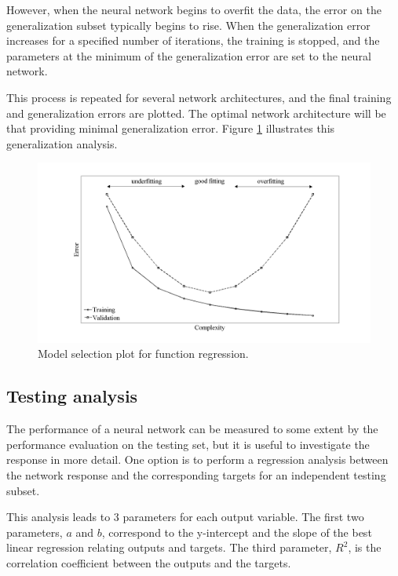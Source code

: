 However, when the neural network begins to overfit the data, the error on the generalization subset typically begins to rise. 
When the generalization error increases for a specified number of iterations, the training is stopped, and the parameters at the minimum of the generalization error are set to the neural network.

This process is repeated for several network architectures, and the final training and generalization errors are plotted. 
The optimal network architecture will be that providing minimal generalization error. 
Figure \ref{ModelSelectionFunctionRegression} illustrates this generalization analysis. 

\begin{figure}[h!]
\begin{center}
\includegraphics[width=1.0\textwidth]{function_regression/model_selection.png}
\caption{Model selection plot for function regression.}\label{ModelSelectionFunctionRegression}
\end{center}
\end{figure}


\subsection*{Testing analysis}

The performance of a neural network can be measured to some extent
by the performance evaluation on the testing set, but it is useful to
investigate the response in more detail. One option is to perform
a regression analysis between the network response and the
corresponding targets for an independent testing subset.

This analysis leads to $3$ parameters for each output variable. The first two parameters, $a$ and $b$,
correspond to the y-intercept and the slope of the best linear
regression relating outputs and targets. The third parameter, $R^{2}$,  is the correlation coefficient between the outputs and the targets. 

